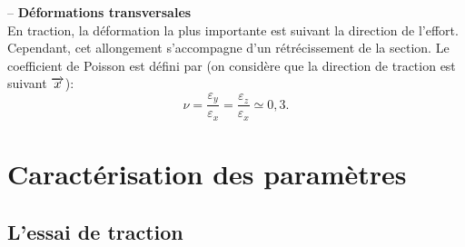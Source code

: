 \documentclass[10pt,fleqn]{article} %
\begin{document}
\begin{resultat} -- \textbf{Déformations transversales} ~\\
En traction, la déformation la plus importante est suivant la direction de l'effort. Cependant, cet allongement s'accompagne d'un rétrécissement de la section. Le coefficient de Poisson est défini par (on considère que la direction de traction est suivant $\overrightarrow{x}$): 
$$
\nu = \dfrac{\varepsilon_y}{\varepsilon_x} = \dfrac{\varepsilon_z}{\varepsilon_x} \simeq 0,3.
$$

\end{resultat}




\section{Caractérisation des paramètres}
\subsection{L'essai de traction}
\end{document}
